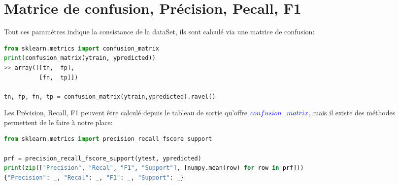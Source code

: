 \section{Matrice de confusion, Précision, Pecall, F1}
Tout ces paramètres indique la consistance de la dataSet, ils sont calculé via une matrice de confusion:\\
\lstset{style=mlpythoncode}
\begin{lstlisting}[language=Python]
from sklearn.metrics import confusion_matrix
print(confusion_matrix(ytrain, ypredicted))
>> array([[tn,  fp],
          [fn,  tp]])
          
tn, fp, fn, tp = confusion_matrix(ytrain,ypredicted).ravel()
\end{lstlisting}


Les Précision, Recall, F1 peuvent être calculé depuis le tableau de sortie qu'offre $\textcolor{blue}{confusion\_matrix}$, mais il existe des méthodes permettent de le faire à notre place:\\

\lstset{style=mlpythoncode}
\begin{lstlisting}[language=Python]
from sklearn.metrics import precision_recall_fscore_support

prf = precision_recall_fscore_support(ytest, ypredicted)
print(zip(["Precision", "Recal", "F1", "Support"], [numpy.mean(row) for row in prf]))
{"Precision": _, "Recal": _, "F1": _, "Support": _}
\end{lstlisting}


